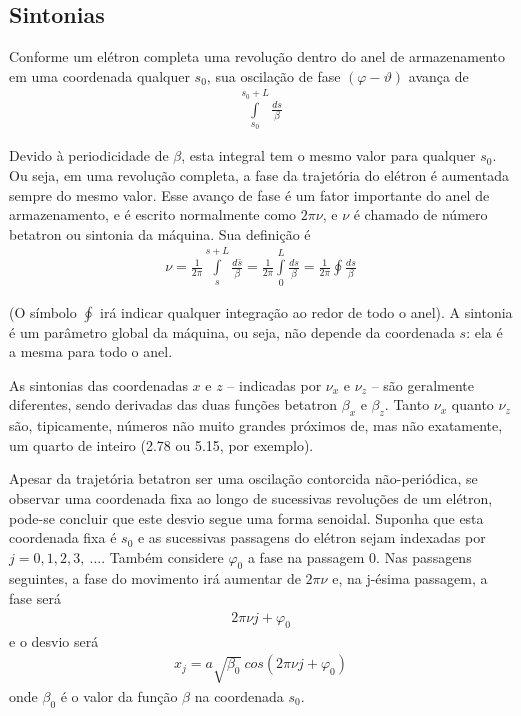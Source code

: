 \subsection{Sintonias}\label{sec:2.7}
Conforme um elétron completa uma revolução dentro do anel de armazenamento em uma coordenada qualquer $s_0$, sua oscilação de fase $(\varphi - \vartheta)$ avança de
\begin{align}
	\int\limits_{s_0}^{s_0+L}\frac{ds}{\beta}
\end{align}

Devido à periodicidade de $\beta$, esta integral tem o mesmo valor para qualquer $s_0$. Ou seja, em uma revolução completa, a fase da trajetória do elétron é aumentada sempre do mesmo valor. Esse avanço de fase é um fator importante do anel de armazenamento, e é escrito normalmente como $2\pi \nu$, e $\nu$ é chamado de número betatron ou sintonia da máquina. Sua definição é
\begin{align}
	\nu = \frac{1}{2 \pi}\int\limits_{s}^{s+L}\frac{d\bar{s}}{\beta} = \frac{1}{2 \pi}\int\limits_{0}^{L}\frac{ds}{\beta} = \frac{1}{2\pi}\oint \frac{ds}{\beta}\label{eq:2.60}
\end{align}

(O símbolo $\oint$ irá indicar qualquer integração ao redor de todo o anel).
A sintonia é um parâmetro global da máquina, ou seja, não depende da coordenada $s$: ela é a mesma para todo o anel.

As sintonias das coordenadas $x$ e $z$ -- indicadas por $\nu_x$ e $\nu_z$ -- são geralmente diferentes, sendo derivadas das duas funções betatron $\beta_x$ e $\beta_z$. Tanto $\nu_x$ quanto $\nu_z$ são, tipicamente, números não muito grandes próximos de, mas não exatamente, um quarto de inteiro (2.78 ou 5.15, por exemplo). 

Apesar da trajetória betatron ser uma oscilação contorcida não-periódica, se observar uma coordenada fixa ao longo de sucessivas revoluções de um elétron, pode-se concluir que este desvio segue uma forma senoidal. Suponha que esta coordenada fixa é $s_0$ e as sucessivas passagens do elétron sejam indexadas por $j=0,1,2,3,\ ...$. Também considere $\varphi_0$ a fase na passagem 0. Nas passagens seguintes, a fase do movimento irá aumentar de $2\pi\nu$ e, na j-ésima passagem, a fase será
\begin{align}
	2\pi\nu j+ \varphi_0
\end{align}
e o desvio será
\begin{align}
	x_j = a\sqrt{\beta_0}\ cos(2\pi\nu j+ \varphi_0)\label{eq:2.61}
\end{align}
onde $\beta_0$ é o valor da função $\beta$ na coordenada $s_0$.

